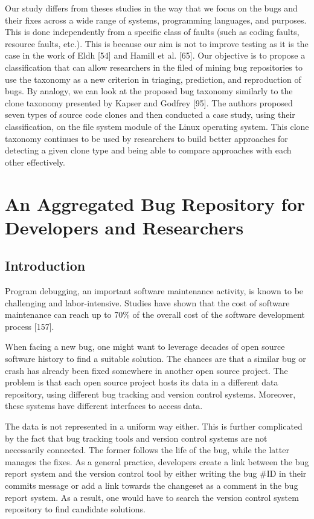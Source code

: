 \documentclass[12pt]{report}
\begin{document}
Our study differs from theses studies in the way that we focus on the
bugs and their fixes across a wide range of systems, programming
languages, and purposes. This is done independently from a specific
class of faults (such as coding faults, resource faults, etc.). This is
because our aim is not to improve testing as it is the case in the work
of Eldh {[}54{]} and Hamill et al. {[}65{]}. Our objective is to propose
a classification that can allow researchers in the filed of mining bug
repositories to use the taxonomy as a new criterion in triaging,
prediction, and reproduction of bugs. By analogy, we can look at the
proposed bug taxonomy similarly to the clone taxonomy presented by
Kapser and Godfrey {[}95{]}. The authors proposed seven types of source
code clones and then conducted a case study, using their classification,
on the file system module of the Linux operating system. This clone
taxonomy continues to be used by researchers to build better approaches
for detecting a given clone type and being able to compare approaches
with each other effectively.

\chapter{An Aggregated Bug Repository for Developers and
Researchers}\label{an-aggregated-bug-repository-for-developers-and-researchers}

\section{Introduction}\label{introduction-1}

Program debugging, an important software maintenance activity, is known
to be challenging and labor-intensive. Studies have shown that the cost
of software maintenance can reach up to 70\% of the overall cost of the
software development process {[}157{]}.

When facing a new bug, one might want to leverage decades of open source
software history to find a suitable solution. The chances are that a
similar bug or crash has already been fixed somewhere in another open
source project. The problem is that each open source project hosts its
data in a different data repository, using different bug tracking and
version control systems. Moreover, these systems have different
interfaces to access data.

The data is not represented in a uniform way either. This is further
complicated by the fact that bug tracking tools and version control
systems are not necessarily connected. The former follows the life of
the bug, while the latter manages the fixes. As a general practice,
developers create a link between the bug report system and the version
control tool by either writing the bug \#ID in their commits message or
add a link towards the changeset as a comment in the bug report system.
As a result, one would have to search the version control system
repository to find candidate solutions.
\end{document}
